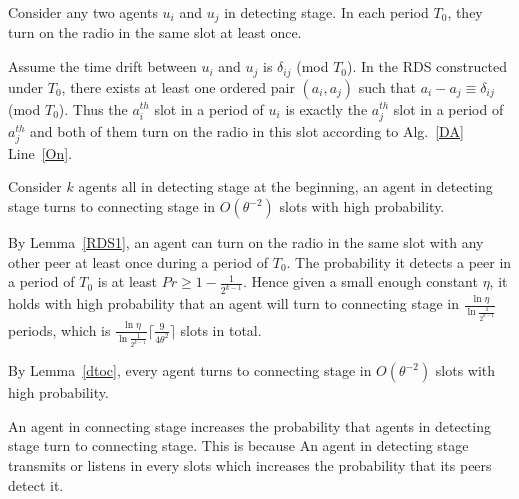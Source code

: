 \begin{lemma}
    \label{RDS1}
    Consider any two agents $u_i$ and $u_j$ in detecting stage.
    In each period $T_0$, they turn on the radio in the same slot at least once.
\end{lemma}
\begin{IEEEproof}
Assume the time drift between $u_i$ and $u_j$ is $\delta_{ij}$ (mod $T_0$).
In the RDS constructed under $T_0$, there exists at least one ordered pair $(a_i,a_j)$ such that $a_i - a_j \equiv \delta_{ij}$ (mod $T_0$).
Thus the $a_i^{th}$ slot in a period of $u_i$ is exactly the $a_j^{th}$ slot in a period of $a_j^{th}$ and both of them
turn on the radio in this slot according to Alg.~\ref{DA} Line~\ref{On}.
\end{IEEEproof}

\begin{lemma}
    \label{dtoc}
    Consider $k$ agents all in detecting stage at the beginning, 
    an agent in detecting stage turns to connecting stage in 
    $O(\theta^{-2})$ slots with high probability.
\end{lemma}
\begin{IEEEproof}
    By Lemma~\ref{RDS1}, an agent can turn on the radio in the same 
    slot with any other peer at least once during a period of $T_0$.
    The probability it detects a peer in a period of $T_0$ is at least
    $Pr \geq 1 - \frac{1}{2^{k-1}}$.
    Hence given a small enough constant $\eta$,  
    it holds with high probability that an agent will turn to connecting stage in 
    $\frac{\ln\eta}{\ln\frac{1}{2^{k-1}}}$ periods, which is 
    $\frac{\ln\eta}{\ln\frac{1}{2^{k-1}}} \lceil \frac{9}{4\theta^{2}} \rceil$ slots
    in total.    
\end{IEEEproof}

\vspace{0.1in}

By Lemma~\ref{dtoc}, every agent turns to connecting stage in 
$O(\theta^{-2})$ slots with high probability. 

\begin{remark}
    An agent in connecting stage increases the probability that 
    agents in detecting stage turn to connecting stage. This is because
    An agent in detecting stage transmits or listens in every slots 
    which increases the probability that its peers detect it.
\end{remark}


   
